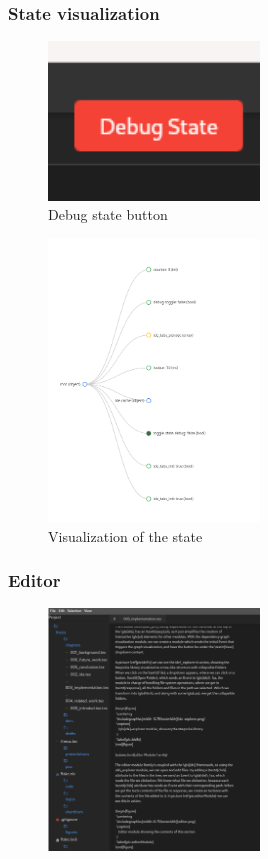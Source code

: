 \begin{frame}
  \frametitle{State visualization}
  \begin{figure}
    \centering
    \includegraphics[width=0.5\textwidth]{./pics/debug-state-btn.png}
    \caption{
      Debug state button
    }
  \end{figure}
  \begin{figure}
    \centering
    \includegraphics[width=0.5\textwidth]{./pics/debug-state.png}
    \caption{
      Visualization of the state
    }
  \end{figure}
\end{frame}

\begin{frame}
  \frametitle{Editor}
  \begin{figure}
    \centering
    \includegraphics[width=0.5\textwidth]{./pics/editor.png}
  \end{figure}
\end{frame}

